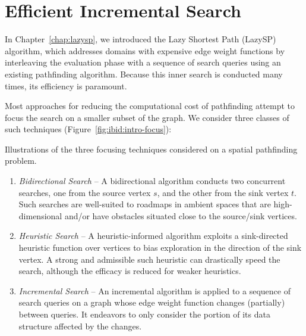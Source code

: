 \chapter{Efficient Incremental Search}
\label{chap:ibid}

In Chapter~\ref{chap:lazysp},
we introduced the Lazy Shortest Path (LazySP) algorithm,
which addresses domains with expensive edge weight functions
by interleaving the evaluation phase with a sequence of 
search queries using an existing pathfinding algorithm.
Because this inner search is conducted many times,
its efficiency is paramount.

Most approaches for reducing the computational cost of pathfinding
attempt to focus the search on a smaller subset of the graph.
We consider three classes of such techniques
(Figure~\ref{fig:ibid:intro-focus}):

\begin{marginfigure}[5cm]%
   \centering%
   
   
   
   \caption{Illustrations of the three focusing techniques considered
      on a spatial pathfinding problem.}%
   \label{fig:ibid:intro-focus}
\end{marginfigure}

\begin{enumerate}
\item \emph{Bidirectional Search} -- A bidirectional algorithm
   conducts two concurrent searches,
   one from the source vertex $s$,
   and the other from the sink vertex $t$.
   Such searches are well-suited to roadmaps in ambient spaces that
   are high-dimensional and/or have
   obstacles situated close to the source/sink vertices.
\item \emph{Heuristic Search} -- A heuristic-informed algorithm
   exploits a sink-directed heuristic function over vertices to bias
   exploration in the direction of the sink vertex.
   A strong and admissible such heuristic can drastically speed the
   search,
   although the efficacy is reduced for weaker heuristics.
\item \emph{Incremental Search} -- An incremental algorithm
   is applied to a sequence of search queries on a graph whose
   edge weight function changes (partially) between queries.
   It endeavors to only consider the portion of its data structure
   affected by the changes.
\end{enumerate}

